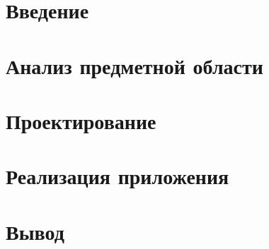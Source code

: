 \documentclass[a4paper,14pt]{extarticle}
\begin{document}
%

\clearpage

{\hypersetup{hidelinks}
\tableofcontents}

\clearpage

\section{Введение}


\section{Анализ предметной области}


\section{Проектирование}


\section{Реализация приложения}


\section{Вывод}

\end{document}
